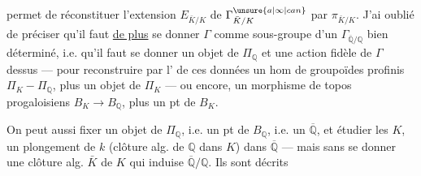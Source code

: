 permet de réconstituer l'extension $E_{\bar K/K}$ de $\Gamma^{\unsure{a|\infty|can}}_{\bar K/K}$ par $\pi_{\bar K/K}$. J'ai oublié de préciser qu'il faut \uline{de plus} se donner $\Gamma$ comme sous-groupe d'un $\Gamma_{\overline{\mathbb Q}/\mathbb Q}$ bien déterminé, i.e. qu'il faut se donner un objet de $\Pi_{\mathbb Q}$ et une action fidèle de $\Gamma$ dessus --- pour reconstruire par l' de ces données un hom de groupoïdes profinis $\Pi_K-\Pi_{\mathbb Q}$, plus un objet de $\Pi_K$ --- ou encore, un morphisme de topos progaloisiens $B_K\longrightarrow B_{\mathbb Q}$, plus un pt de $B_K$.

On peut aussi fixer un objet de $\Pi_{\mathbb Q}$, i.e. un pt de $B_{\mathbb Q}$, i.e. un $\overline{\mathbb Q}$, et étudier les $K$,  un plongement de $k$ (clôture alg. de $\mathbb Q$ dans $K$) dans $\overline{\mathbb Q}$ ---  mais sans se donner une clôture alg. $\bar K$ de $K$ qui induise $\overline{\mathbb Q}/\mathbb Q$. Ils sont décrits
